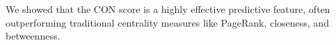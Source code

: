 \documentclass[preview]{standalone}
\begin{document}
We showed that the CON score is a highly effective predictive feature, often outperforming traditional centrality measures like PageRank, closeness, and betweenness.\\
\end{document}
